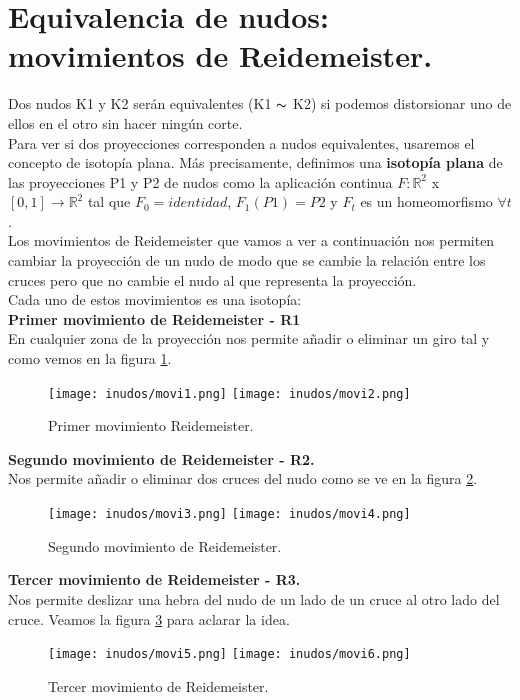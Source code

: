 \bigskip
\section{Equivalencia de nudos: movimientos de Reidemeister.}\label{seccion4}
Dos nudos K1 y K2 serán equivalentes (K1 $\thicksim$ K2) si podemos distorsionar uno de ellos en el otro sin hacer ningún corte. \\

Para ver si dos proyecciones corresponden a nudos equivalentes, usaremos el concepto de isotopía plana. Más precisamente, definimos una \textbf{isotopía plana} de las proyecciones P1 y P2 de nudos como la aplicación continua $F: \mathds{R}^{2}$ x $[0,1] \rightarrow \mathds{R}^{2}$ tal que $F_{0}=identidad$, $F_{1}(P1) = P2$ y $F_{t}$ es un homeomorfismo $\forall t$.\\

Los movimientos de Reidemeister que vamos a ver a continuación nos permiten cambiar la proyección de un nudo de modo que se cambie la relación entre los cruces pero que no cambie el nudo al que representa la proyección. \\
Cada uno de estos movimientos es una isotopía:\\

\textbf{Primer movimiento de Reidemeister - R1}\\
En cualquier zona de la proyección nos permite añadir o eliminar un giro tal y como vemos en la figura \ref{movi1}.
  \begin{figure}[h!]
  	\texttt{[image: inudos/movi1.png]}
  	\texttt{[image: inudos/movi2.png]}
  	\centering
  	\caption{Primer movimiento Reidemeister.}
  	\label{movi1} 
  \end{figure}
  
	\textbf{Segundo movimiento de Reidemeister - R2.}\\
Nos permite añadir o eliminar dos cruces del nudo como se ve en la figura \ref{movi2}.
    \begin{figure}[h!]
    	\texttt{[image: inudos/movi3.png]}
    	\texttt{[image: inudos/movi4.png]}
    	\centering
    	\caption{Segundo movimiento de Reidemeister.}
    	\label{movi2} 
    \end{figure}
    
	\textbf{Tercer movimiento de Reidemeister - R3.}\\
Nos permite deslizar una hebra del nudo de un lado de un cruce al otro lado del cruce. Veamos la figura \ref{movi3} para aclarar la idea.
      \begin{figure}[h!]
      	\texttt{[image: inudos/movi5.png]}
      	\texttt{[image: inudos/movi6.png]}
      	\centering
      	\caption{Tercer movimiento de Reidemeister.}
      	\label{movi3} 
      \end{figure}
  

